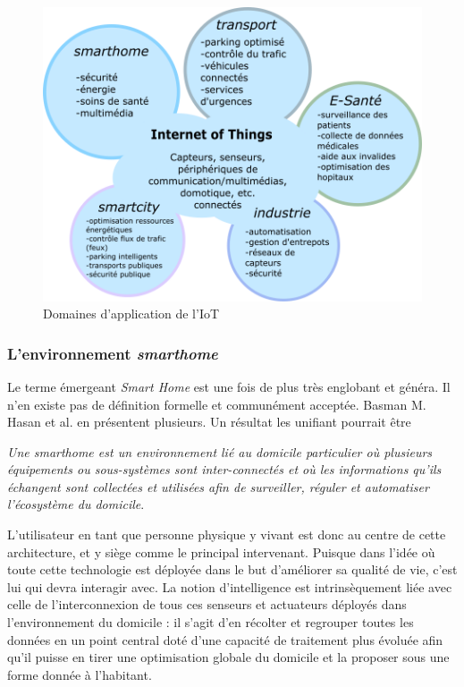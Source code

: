 \documentclass[]{article}
\begin{document}
\begin{figure}[!h]
\centering
\includegraphics[width=0.6\linewidth]{IoT_domains.png}
\caption{Domaines d'application de l'IoT}
\label{domains_IoT}
\end{figure}

\newpage

\subsubsection{L'environnement \textit{smarthome}}
\par Le terme émergeant \textit{Smart Home} est une fois de plus très englobant et généra. Il n'en existe pas de définition formelle et communément acceptée. Basman M. Hasan et al. \cite{Basman2016} en présentent plusieurs. Un résultat les unifiant pourrait être
\begin{center}
 \textit{\og Une smarthome est un environnement lié au domicile particulier où plusieurs équipements ou sous-systèmes sont inter-connectés et où les informations qu'ils échangent sont collectées et utilisées afin de surveiller, réguler et automatiser l'écosystème du domicile\fg{}}.\\
\end{center}

\par L'utilisateur en tant que personne physique y vivant est donc au centre de cette architecture, et y siège comme le principal intervenant. Puisque dans l'idée où toute cette technologie est déployée dans le but d'améliorer sa qualité de vie, c'est lui qui devra interagir avec. La notion d'intelligence est intrinsèquement liée avec celle de l'interconnexion de tous ces senseurs et actuateurs déployés dans l'environnement du domicile : il s'agit d'en récolter et regrouper toutes les données en un point central doté d'une capacité de traitement plus évoluée afin qu'il puisse en tirer une optimisation globale du domicile et la proposer sous une forme donnée à l'habitant.\\
\end{document}

